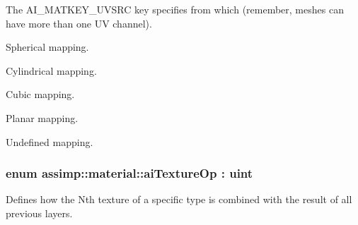 \begin{Desc}
\begin{description}
The {\ttfamily A\+I\+\_\+\+M\+A\+T\+K\+E\+Y\+\_\+\+U\+V\+S\+R\+C} key specifies from which (remember, meshes can have more than one U\+V channel). \item[{\em 
\hypertarget{namespaceassimp_1_1material_ae0a6af9b6411ae81bf4227ab6b36f679a360d776c5aaa1419588c7323ef1cca6e}{S\+P\+H\+E\+R\+E}\label{namespaceassimp_1_1material_ae0a6af9b6411ae81bf4227ab6b36f679a360d776c5aaa1419588c7323ef1cca6e}
}]Spherical mapping. \item[{\em 
\hypertarget{namespaceassimp_1_1material_ae0a6af9b6411ae81bf4227ab6b36f679a47dee946b0be7bdd5c4bb0f5e9ef2033}{C\+Y\+L\+I\+N\+D\+E\+R}\label{namespaceassimp_1_1material_ae0a6af9b6411ae81bf4227ab6b36f679a47dee946b0be7bdd5c4bb0f5e9ef2033}
}]Cylindrical mapping. \item[{\em 
\hypertarget{namespaceassimp_1_1material_ae0a6af9b6411ae81bf4227ab6b36f679a9c9d284b01915e6ca040fdc35ff81901}{B\+O\+X}\label{namespaceassimp_1_1material_ae0a6af9b6411ae81bf4227ab6b36f679a9c9d284b01915e6ca040fdc35ff81901}
}]Cubic mapping. \item[{\em 
\hypertarget{namespaceassimp_1_1material_ae0a6af9b6411ae81bf4227ab6b36f679a1550da55ba97eaf075f6dd2d3ec97aeb}{P\+L\+A\+N\+E}\label{namespaceassimp_1_1material_ae0a6af9b6411ae81bf4227ab6b36f679a1550da55ba97eaf075f6dd2d3ec97aeb}
}]Planar mapping. \item[{\em 
\hypertarget{namespaceassimp_1_1material_ae0a6af9b6411ae81bf4227ab6b36f679adc9988884766d74c9fc93091e6d543d3}{O\+T\+H\+E\+R}\label{namespaceassimp_1_1material_ae0a6af9b6411ae81bf4227ab6b36f679adc9988884766d74c9fc93091e6d543d3}
}]Undefined mapping. \end{description}
\end{Desc}
\hypertarget{namespaceassimp_1_1material_ab30a105144c2d883a472a0da51309df3}{
\subsubsection[{ai\+Texture\+Op}]{\setlength{\rightskip}{0pt plus 5cm}enum {\bf assimp\+::material\+::ai\+Texture\+Op} \+: uint}}\label{namespaceassimp_1_1material_ab30a105144c2d883a472a0da51309df3}
Defines how the Nth texture of a specific type is combined with the result of all previous layers.

